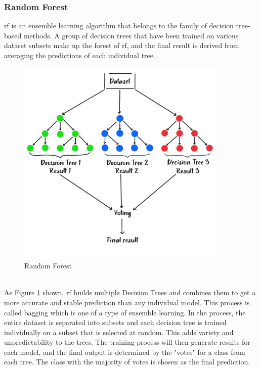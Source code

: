 \subsubsection{Random Forest}
\nocite{er_2021_random}
\nocite{scikitlearn_2018_sklearnensemblerandomforestclassifier}
\nocite{yiu_2019_understanding}
\gls{rf} is an ensemble learning algorithm that belongs to the family of decision tree-based methods.
A group of decision trees that have been trained on various dataset subsets make up the forest of \gls{rf}, and the final result is derived from averaging the predictions of each individual tree. \citep{ibm_2023_what}
\\
\begin{figure}[!ht]
    \centering
    \includegraphics[width=10cm]{Images/rf.png}
    \caption{Random Forest}
    \label{fig:rf}
\end{figure}
\\
\indent As Figure \ref{fig:rf} shown, \gls{rf} builds multiple Decision Trees and combines them to get a more accurate and stable prediction than any individual model.
This process is called bagging which is one of a type of ensemble learning. 
In the process, the entire dataset is separated into subsets and each decision tree is trained individually on a subset that is selected at random.
This adds variety and unpredictability to the trees.
The training process will then generate results for each model, and the final output is determined by the "votes" for a class from each tree.
The class with the majority of votes is chosen as the final prediction.
